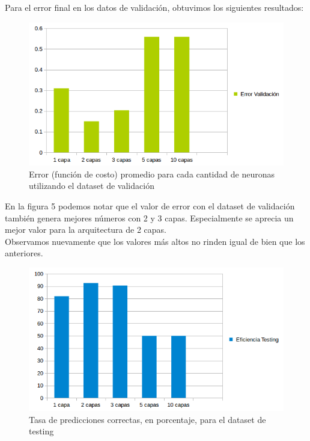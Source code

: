 Para el error final en los datos de validación, obtuvimos los siguientes resultados:\\

\begin{figure}[h]
  \begin{center}
  \includegraphics[scale=0.75]{graficos/fig2_cant_capas_error_valid.png}
  \caption{Error (función de costo) promedio para cada cantidad de neuronas utilizando el dataset de validación}
  \end{center}
\end{figure}


En la figura 5 podemos notar que el valor de error con el dataset de validación también 
genera mejores números con 2 y 3 capas. Especialmente se aprecia un mejor valor para la arquitectura de 2 capas.\\
Observamos nuevamente que los valores más altos no rinden igual de bien que los anteriores.

\begin{figure}[h]
  \begin{center}
  \includegraphics[scale=0.75]{graficos/fig3_cant_capas_testing.png}
  \caption{Tasa de predicciones correctas, en porcentaje, para el dataset de testing}
  \end{center}
\end{figure}

